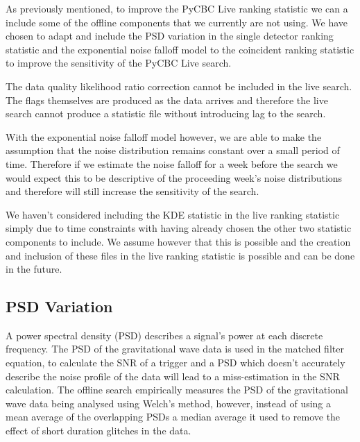 As previously mentioned, to improve the PyCBC Live ranking statistic we can a include some of the offline components that we currently are not using. We have chosen to adapt and include the PSD variation in the single detector ranking statistic and the exponential noise falloff model to the coincident ranking statistic to improve the sensitivity of the PyCBC Live search.

The data quality likelihood ratio correction cannot be included in the live search. The flags themselves are produced as the data arrives and therefore the live search cannot produce a statistic file without introducing lag to the search.

With the exponential noise falloff model however, we are able to make the assumption that the noise distribution remains constant over a small period of time. Therefore if we estimate the noise falloff for a week before the search we would expect this to be descriptive of the proceeding week's noise distributions and therefore will still increase the sensitivity of the search.

We haven't considered including the KDE statistic in the live ranking statistic simply due to time constraints with having already chosen the other two statistic components to include. We assume however that this is possible and the creation and inclusion of these files in the live ranking statistic is possible and can be done in the future.

\subsection{\label{pycbclive-psd-var}PSD Variation}

A power spectral density (PSD) describes a signal's power at each discrete frequency. The PSD of the gravitational wave data is used in the matched filter equation,
%
%
to calculate the SNR of a trigger and a PSD which doesn't accurately describe the noise profile of the data will lead to a miss-estimation in the SNR calculation. The offline search empirically measures the PSD of the gravitational wave data being analysed using Welch's method, however, instead of using a mean average of the overlapping PSDs a median average it used to remove the effect of short duration glitches in the data.

